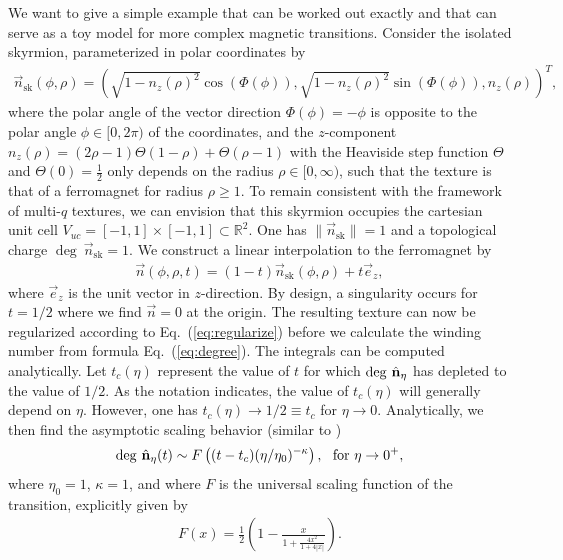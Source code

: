 \documentclass[submission, Phys]{SciPost}
\begin{document}
We want to give a simple example that can be worked out exactly and that can serve as a toy model for more complex magnetic transitions. 
Consider the isolated skyrmion, parameterized in polar coordinates by
\begin{align}
    \vec{n}_{\mathrm{sk}}(\phi, \rho) = ( \sqrt{1-n_z(\rho)^2} \cos(\Phi(\phi)), \sqrt{1-n_z(\rho)^2} \sin(\Phi(\phi)), n_z(\rho))^T,
\end{align}
where the polar angle of the vector direction $\Phi(\phi)=-\phi$ is opposite to the polar angle $\phi\in[0,2\pi)$ of the coordinates, and the $z$-component $n_z(\rho) = (2\rho-1) \Theta(1-\rho) + \Theta(\rho-1)$ with the Heaviside step function $\Theta$ and $\Theta(0)=\frac{1}{2}$ only depends on the radius $\rho\in[0,\infty)$, such that the texture is that of a ferromagnet for radius $\rho\geq 1$.
To remain consistent with the framework of multi-$q$ textures, we can envision that this skyrmion occupies the cartesian unit cell $V_{uc} = [-1,1] \times [-1,1] \subset \mathbb{R}^2$.
One has $\|  \vec{n}_{\mathrm{sk}} \| = 1$ and a topological charge $\deg~\vec{n}_{\mathrm{sk}} = 1$.
We construct a linear interpolation to the ferromagnet by
\begin{align}
    \vec{n}(\phi, \rho, t) =  (1-t) \vec{n}_{\mathrm{sk}}(\phi, \rho) + t  \vec{e}_z,
\end{align}
where $\vec{e}_z$ is the unit vector in $z$-direction. By design, a singularity occurs for $t=1/2$ where we find 
$ \vec{n}= 0$ at the origin.
The resulting texture can now be regularized according to Eq.~(\ref{eq:regularize}) before we calculate the winding number from formula Eq.~(\ref{eq:degree}).
The integrals can be computed analytically.
Let $t_c(\eta)$ represent the value of $t$ for which $\mathrm{deg} ~ \hat{\mathbf{n}}_{\eta}$ has depleted to the value of $1/2$.
As the notation indicates, the value of $t_c(\eta)$ will generally depend on $\eta$. However, one has $t_c(\eta) \to 1/2 \equiv t_c$ for $\eta \to 0$.
Analytically, we then find the asymptotic scaling behavior (similar to \cite{Pruisken1988,Xue2013})
\begin{align}
    \mathrm{deg} ~ \hat{\mathbf{n}}_{\eta}(t) \sim  F\left( (t-t_c )  (\eta /\eta_0)^{-\kappa}  \right), ~~ \text{for}~\eta \to 0^+,
\end{align}
where $\eta_0 = 1$, $\kappa =1$, and where $F$ is the universal scaling function of the transition, explicitly given by
\begin{align}
    F(x) = \frac{1}{2} \left( 1- \frac{x}{1+ \frac{4 x^2}{1+4|x|}} \right).
\end{align}
\end{document}
